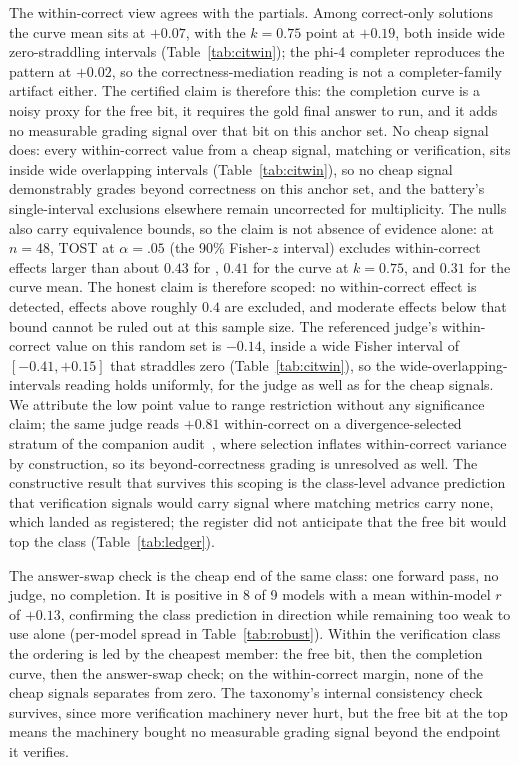 The within-correct view agrees with the partials.
Among correct-only solutions the curve mean sits at $+0.07$, with the $k{=}0.75$ point at $+0.19$, both inside wide zero-straddling intervals (Table~\ref{tab:citwin}); the phi-4 completer reproduces the pattern at $+0.02$, so the correctness-mediation reading is not a completer-family artifact either.
The certified claim is therefore this: the completion curve is a noisy proxy for the free bit, it requires the gold final answer to run, and it adds no measurable grading signal over that bit on this anchor set.
No cheap signal does: every within-correct value from a cheap signal, matching or verification, sits inside wide overlapping intervals (Table~\ref{tab:citwin}), so no cheap signal demonstrably grades beyond correctness on this anchor set, and the battery's single-interval exclusions elsewhere remain uncorrected for multiplicity.
The nulls also carry equivalence bounds, so the claim is not absence of evidence alone: at $n{=}48$, TOST at $\alpha{=}.05$ (the 90\% Fisher-$z$ interval) excludes within-correct effects larger than about $0.43$ for \tfa, $0.41$ for the curve at $k{=}0.75$, and $0.31$ for the curve mean.
The honest claim is therefore scoped: no within-correct effect is detected, effects above roughly $0.4$ are excluded, and moderate effects below that bound cannot be ruled out at this sample size.
The referenced judge's within-correct value on this random set is $-0.14$, inside a wide Fisher interval of $[-0.41, +0.15]$ that straddles zero (Table~\ref{tab:citwin}), so the wide-overlapping-intervals reading holds uniformly, for the judge as well as for the cheap signals.
We attribute the low point value to range restriction without any significance claim; the same judge reads $+0.81$ within-correct on a divergence-selected stratum of the companion audit~\cite{companionA}, where selection inflates within-correct variance by construction, so its beyond-correctness grading is unresolved as well.
The constructive result that survives this scoping is the class-level advance prediction that verification signals would carry signal where matching metrics carry none, which landed as registered; the register did not anticipate that the free bit would top the class (Table~\ref{tab:ledger}).

The answer-swap check is the cheap end of the same class: one forward pass, no judge, no completion.
It is positive in 8 of 9 models with a mean within-model $r$ of $+0.13$, confirming the class prediction in direction while remaining too weak to use alone (per-model spread in Table~\ref{tab:robust}).
Within the verification class the ordering is led by the cheapest member: the free bit, then the completion curve, then the answer-swap check; on the within-correct margin, none of the cheap signals separates from zero.
The taxonomy's internal consistency check survives, since more verification machinery never hurt, but the free bit at the top means the machinery bought no measurable grading signal beyond the endpoint it verifies.


